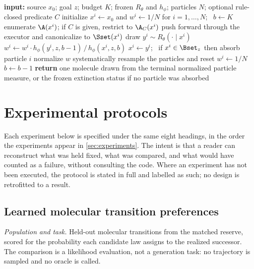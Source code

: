 \begin{algorithm}[h]
\caption{Controlled molecular sampling, sequential realization}
\begin{algorithmic}[1]
\STATE \textbf{input:} source $x_0$; goal $z$; budget $K$; frozen $R_\theta$ and $h_\phi$; particles $N$; optional rule-closed predicate $C$
\STATE initialize $x^i \leftarrow x_0$ and $w^i \leftarrow 1/N$ for $i=1,\dots,N$; \ $b \leftarrow K$
    \STATE enumerate $\A(x^i)$; if $C$ is given, restrict to $\A_C(x^i)$
    \STATE push forward through the executor and canonicalize to $\Sset(x^i)$
    \STATE draw $y^i \sim R_\theta(\cdot \mid x^i)$ \hfill {}
    \STATE $w^i \leftarrow w^i \cdot h_\phi(y^i,z,b-1) \,/\, h_\phi(x^i,z,b)$ \hfill {}
    \STATE $x^i \leftarrow y^i$; \ if $x^i \in \Bset_z$ then absorb particle $i$
  \ENDFOR
  \STATE normalize $w$
    \STATE systematically resample the particles and reset $w^i \leftarrow 1/N$
  \ENDIF
  \STATE $b \leftarrow b-1$
\ENDWHILE
\STATE \textbf{return} one molecule drawn from the terminal normalized particle measure, or the frozen extinction status if no particle was absorbed
\end{algorithmic}
\end{algorithm}

\section{Experimental protocols}
\label{app:protocols}

Each experiment below is specified under the same eight headings, in the order the experiments appear in \cref{sec:experiments}. The intent is that a reader can reconstruct what was held fixed, what was compared, and what would have counted as a failure, without consulting the code. Where an experiment has not been executed, the protocol is stated in full and labelled as such; no design is retrofitted to a result.

\subsection{Learned molecular transition preferences}
\label{app:proto-rtheta}

\emph{Population and task.} Held-out molecular transitions from the matched reserve, scored for the probability each candidate law assigns to the realized successor. The comparison is a likelihood evaluation, not a generation task: no trajectory is sampled and no oracle is called.

